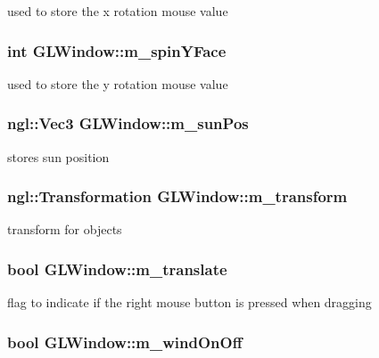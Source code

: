 used to store the x rotation mouse value \hypertarget{classGLWindow_aa4c39badfa80d8eac6a773449b6db5a2}{
\subsubsection[{m\_\-spinYFace}]{\setlength{\rightskip}{0pt plus 5cm}int {\bf GLWindow::m\_\-spinYFace}}}
\label{classGLWindow_aa4c39badfa80d8eac6a773449b6db5a2}


used to store the y rotation mouse value \hypertarget{classGLWindow_a5cf8db1c199804e46473343a51219dfb}{
\subsubsection[{m\_\-sunPos}]{\setlength{\rightskip}{0pt plus 5cm}ngl::Vec3 {\bf GLWindow::m\_\-sunPos}}}
\label{classGLWindow_a5cf8db1c199804e46473343a51219dfb}


stores sun position \hypertarget{classGLWindow_aea05160d13c53f0fee53e22c8c55368e}{
\subsubsection[{m\_\-transform}]{\setlength{\rightskip}{0pt plus 5cm}ngl::Transformation {\bf GLWindow::m\_\-transform}}}
\label{classGLWindow_aea05160d13c53f0fee53e22c8c55368e}


transform for objects \hypertarget{classGLWindow_a3a7f7ae3fbde7c5e24ff677a6ed34563}{
\subsubsection[{m\_\-translate}]{\setlength{\rightskip}{0pt plus 5cm}bool {\bf GLWindow::m\_\-translate}}}
\label{classGLWindow_a3a7f7ae3fbde7c5e24ff677a6ed34563}


flag to indicate if the right mouse button is pressed when dragging \hypertarget{classGLWindow_af5ed492255bbfea3403731254e2a23f1}{
\subsubsection[{m\_\-windOnOff}]{\setlength{\rightskip}{0pt plus 5cm}bool {\bf GLWindow::m\_\-windOnOff}}}
\label{classGLWindow_af5ed492255bbfea3403731254e2a23f1}



